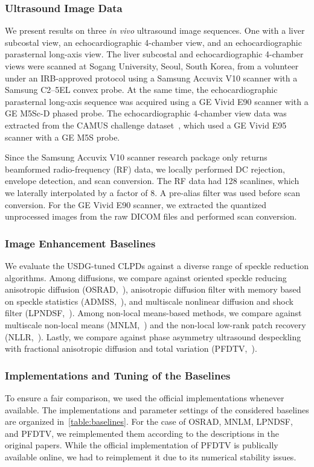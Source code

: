 \subsubsection{Ultrasound Image Data}
We present results on three \textit{in vivo} ultrasound image sequences.
One with a liver subcostal view, an echocardiographic 4-chamber view, and an echocardiographic parasternal long-axis view.
The liver subcostal and echocardiographic 4-chamber views were scanned at Sogang University, Seoul, South Korea, from a volunteer under an IRB-approved protocol using a Samsung Accuvix V10 scanner with a Samsung C2--5EL convex probe. At the same time, the echocardiographic parasternal long-axis sequence was acquired using a GE Vivid E90 scanner with a GE M5Sc-D phased probe.
The echocardiographic 4-chamber view data was extracted from the CAMUS challenge dataset~\cite{leclerc_deep_2019}, which used a GE Vivid E95 scanner with a GE M5S probe.

Since the Samsung Accuvix V10 scanner research package only returns beamformed radio-frequency (RF) data, we locally performed DC rejection, envelope detection, and scan conversion.
The RF data had 128 scanlines, which we laterally interpolated by a factor of 8.
A pre-alias filter was used before scan conversion.
For the GE Vivid E90 scanner, we extracted the quantized unprocessed images from the raw DICOM files and performed scan conversion.

\subsubsection{Image Enhancement Baselines}
We evaluate the USDG-tuned CLPDs against a diverse range of speckle reduction algorithms.
Among diffusions, we compare against oriented speckle reducing anisotropic diffusion (OSRAD,~\cite{krissian_oriented_2007}), anisotropic diffusion filter with memory based on speckle statistics (ADMSS,~\cite{ramos-llorden_anisotropic_2015}), and multiscale nonlinear diffusion and shock filter (LPNDSF,~\cite{zhang_multiscale_2006}).
Among non-local means-based methods, we compare against multiscale non-local means (MNLM,~\cite{breivik_realtime_2017}) and the non-local low-rank patch recovery (NLLR,~\cite{zhu_nonlocal_2017}).
Lastly, we compare against phase asymmetry ultrasound despeckling with fractional anisotropic diffusion and total variation (PFDTV,~\cite{mei_phase_2020}).

\subsubsection{Implementations and Tuning of the Baselines}
To ensure a fair comparison, we used the official implementations whenever available.
The implementations and parameter settings of the considered baselines are organized in~\cref{table:baselines}.
For the case of OSRAD, MNLM, LPNDSF, and PFDTV, we reimplemented them according to the descriptions in the original papers.
While the official implementation of PFDTV is publically available online, we had to reimplement it due to its numerical stability issues.

